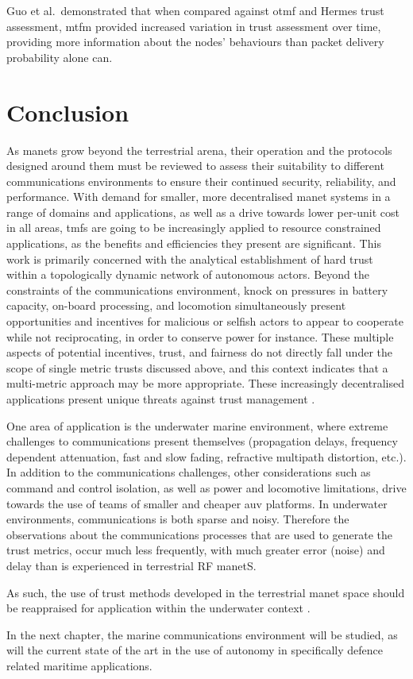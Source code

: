 Guo et al.\ demonstrated that when compared against \gls{otmf} and Hermes trust assessment, \gls{mtfm} provided increased variation in trust assessment over time, providing more information about the nodes' behaviours than packet delivery probability alone can.

\section{Conclusion}

As \glspl{manet} grow beyond the terrestrial arena, their operation and the protocols designed around them must be reviewed to assess their suitability to different communications environments to ensure their continued security, reliability, and performance.
With demand for smaller, more decentralised \gls{manet} systems in a range of domains and applications, as well as a drive towards lower per-unit cost in all areas, \glspl{tmf} are going to be increasingly applied to resource constrained applications, as the benefits and efficiencies they present are significant.
This work is primarily concerned with the analytical establishment of hard trust within a topologically dynamic network of autonomous actors.
Beyond the constraints of the communications environment, knock on pressures in battery capacity, on-board processing, and locomotion simultaneously present opportunities and incentives for malicious or selfish actors to appear to cooperate while not reciprocating, in order to conserve power for instance.
These multiple aspects of potential incentives, trust, and fairness do not directly fall under the scope of single metric trusts discussed above, and this context indicates that a multi-metric approach may be more appropriate.
These increasingly decentralised applications present unique threats against trust management \cite{Caiti2011}.

One area of application is the underwater marine environment, where extreme challenges to communications present themselves (propagation delays, frequency dependent attenuation, fast and slow fading, refractive multipath distortion, etc.).
In addition to the communications challenges, other considerations such as command and control isolation, as well as power and locomotive limitations, drive towards the use of teams of smaller and cheaper \gls{auv} platforms.
In underwater environments, communications is both sparse and noisy.
Therefore the observations about the communications processes that are used to generate the trust metrics, occur much less frequently, with much greater error (noise) and delay than is experienced in terrestrial RF \gls{manet}S.

As such, the use of trust methods developed in the terrestrial \gls{manet} space should be reappraised for application within the underwater context \cite{Pavan2015}.

In the next chapter, the marine communications environment will be studied, as will the current state of the art in the use of autonomy in specifically defence related maritime applications.
\ifx\ifthesis\undefined

\else
\fi
